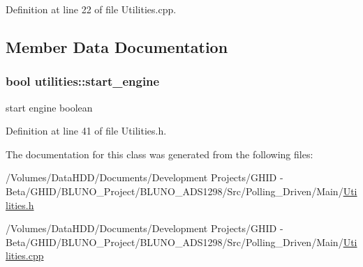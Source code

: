 \-Definition at line 22 of file \-Utilities.\-cpp.



\subsection{\-Member \-Data \-Documentation}
\hypertarget{classutilities_a00ad17c59af67ff895854c2510407513}{
\subsubsection[{start\-\_\-engine}]{\setlength{\rightskip}{0pt plus 5cm}bool {\bf utilities\-::start\-\_\-engine}}}\label{classutilities_a00ad17c59af67ff895854c2510407513}


start engine boolean 



\-Definition at line 41 of file \-Utilities.\-h.



\-The documentation for this class was generated from the following files\-:\begin{DoxyCompactItemize}
\item 
/\-Volumes/\-Data\-H\-D\-D/\-Documents/\-Development Projects/\-G\-H\-I\-D -\/ Beta/\-G\-H\-I\-D/\-B\-L\-U\-N\-O\-\_\-\-Project/\-B\-L\-U\-N\-O\-\_\-\-A\-D\-S1298/\-Src/\-Polling\-\_\-\-Driven/\-Main/\hyperlink{_utilities_8h}{\-Utilities.\-h}\item 
/\-Volumes/\-Data\-H\-D\-D/\-Documents/\-Development Projects/\-G\-H\-I\-D -\/ Beta/\-G\-H\-I\-D/\-B\-L\-U\-N\-O\-\_\-\-Project/\-B\-L\-U\-N\-O\-\_\-\-A\-D\-S1298/\-Src/\-Polling\-\_\-\-Driven/\-Main/\hyperlink{_utilities_8cpp}{\-Utilities.\-cpp}\end{DoxyCompactItemize}
